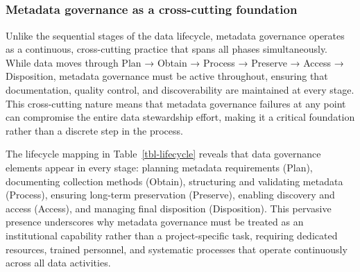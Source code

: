 \documentclass[
  letterpaper,
  DIV=11,
  numbers=noendperiod]{scrartcl}
\begin{document}
\begin{longtable}[]
 \\
 \\
 \\
 \\
\end{longtable}

\subsubsection{Metadata governance as a cross-cutting
foundation}\label{metadata-governance-as-a-cross-cutting-foundation}

Unlike the sequential stages of the data lifecycle, metadata governance
operates as a continuous, cross-cutting practice that spans all phases
simultaneously. While data moves through Plan → Obtain → Process →
Preserve → Access → Disposition, metadata governance must be active
throughout, ensuring that documentation, quality control, and
discoverability are maintained at every stage. This cross-cutting nature
means that metadata governance failures at any point can compromise the
entire data stewardship effort, making it a critical foundation rather
than a discrete step in the process.

The lifecycle mapping in Table~\ref{tbl-lifecycle} reveals that data
governance elements appear in every stage: planning metadata
requirements (Plan), documenting collection methods (Obtain),
structuring and validating metadata (Process), ensuring long-term
preservation (Preserve), enabling discovery and access (Access), and
managing final disposition (Disposition). This pervasive presence
underscores why metadata governance must be treated as an institutional
capability rather than a project-specific task, requiring dedicated
resources, trained personnel, and systematic processes that operate
continuously across all data activities.
\end{document}
